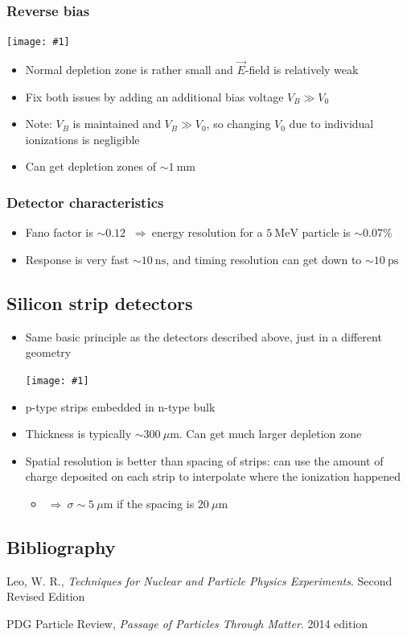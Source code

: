 \documentclass[11pt]{article}
\newcommand{\E}{\ensuremath{\vec{E}}}
\newcommand{\ns}{\text{ns}}
\newcommand{\ps}{\text{ps}}
\newcommand{\mum}{\mu\text{m}}
\newcommand{\mm}{\text{mm}}
\newcommand{\mev}{\text{MeV}}
\newcommand{\thus}{$~\Rightarrow~$}
\newcommand{\embedimgw}[2]{\begin{center}\texttt{[image: \#1]}\end{center}}
\begin{document}
\subsubsection{Reverse bias}
\embedimgw{figs/reversebias.png}{.8}
\begin{itemize}
  \item Normal depletion zone is rather small and \E-field is relatively weak
  \item Fix both issues by adding an additional bias voltage $V_B\gg V_0$
  \item Note: $V_B$ is maintained and $V_B\gg V_0$, so changing $V_0$ due to individual ionizations is negligible
  \item Can get depletion zones of $\sim1~\mm$
\end{itemize}

\subsubsection{Detector characteristics}
\begin{itemize}
  \item Fano factor is $\sim 0.12$ \thus energy resolution for a $5~\mev$ particle is $\sim 0.07\%$
  \item Response is very fast $\sim 10~\ns$, and timing resolution can get down to $\sim 10~\ps$
\end{itemize}

\subsection{Silicon strip detectors}
\begin{itemize}
  \item Same basic principle as the detectors described above, just in a different geometry
  \embedimgw{figs/strips.png}{.4}
  \item p-type strips embedded in n-type bulk
  \item Thickness is typically $\sim 300~\mum$. Can get much larger depletion zone
  \item Spatial resolution is better than spacing of strips: can use the amount of charge deposited on each strip to interpolate where the ionization happened
  \begin{itemize}
    \item \thus $\sigma \sim 5~\mum$ if the spacing is $20~\mum$
  \end{itemize}
\end{itemize}

\begin{appendices}
\section{Bibliography}

Leo, W. R., \emph{Techniques for Nuclear and Particle Physics Experiments}. Second Revised Edition
\vspace{5mm}

\noindent PDG Particle Review, \emph{Passage of Particles Through Matter}. 2014 edition

\end{appendices}
\end{document}
